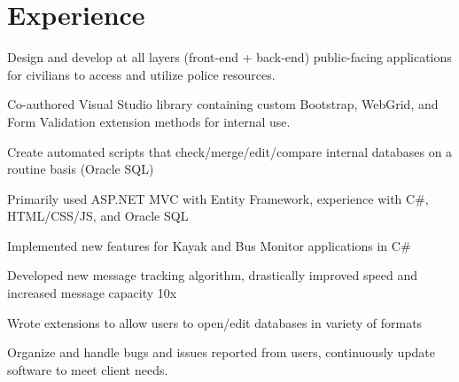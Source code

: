 \documentclass[letterpaper]{deedy-resume} %
\begin{document}
\begin{minipage}[t]{0.66\textwidth} %


\section{Experience}


\vspace{\topsep} %
\begin{tightitemize}
\item Design and develop at all layers (front-end + back-end) public-facing applications for civilians to access and utilize police resources.  
\item Co-authored Visual Studio library containing custom Bootstrap, WebGrid, and Form Validation extension methods for internal use.
\item Create automated scripts that check/merge/edit/compare internal databases on a routine basis (Oracle SQL)
\item Primarily used ASP.NET MVC with Entity Framework, experience with C\#, HTML/CSS/JS, and Oracle SQL
\end{tightitemize}

\sectionspace %


\begin{tightitemize}
\item Implemented new features for Kayak and Bus Monitor applications in C\#
\item Developed new message tracking algorithm, drastically improved speed and increased message capacity 10x 
\item Wrote extensions to allow users to open/edit databases in variety of formats
\item Organize and handle bugs and issues reported from users, continuously update software to meet client needs.
\end{tightitemize}


\end{minipage}
\end{document}
